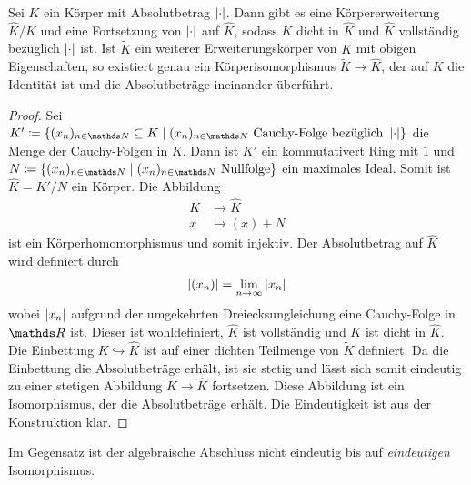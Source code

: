\begin{satz}
Sei $K$ ein Körper mit Absolutbetrag $\left\vert\cdot\right\vert$.
Dann gibt es eine Körpererweiterung $\hat{K}/K$ und eine Fortsetzung von $\left\vert\cdot\right\vert$ auf $\hat{K}$, sodass $K$ dicht in $\hat{K}$ und $\hat{K}$ vollständig bezüglich $\left\vert\cdot\right\vert$ ist.
Ist $\tilde{K}$ ein weiterer Erweiterungskörper von $K$ mit obigen Eigenschaften,
so existiert genau ein Körperisomorphismus $\tilde{K}\to \hat{K}$, der auf $K$ die Identität ist
und die Absolutbeträge ineinander überführt.
\begin{proof}
Sei $K'\coloneqq\{(x_n)_{n\in \N}\subseteq K \mid (x_n)_{n\in \N} \text{ Cauchy-Folge bezüglich } \abs{\cdot}\}$ die Menge der Cauchy-Folgen in $K$.
Dann ist $K'$ ein kommutativert Ring mit $1$ und $N\coloneqq\{(x_n)_{n\in \N}\mid (x_n)_{n\in \N} \text{ Nullfolge}\}$
ein maximales Ideal.
Somit ist $\hat{K}=K'/N$ ein Körper. Die Abbildung
\begin{align*}
K &\to \hat{K}\\
x &\mapsto (x)+N
\end{align*}
ist ein Körperhomomorphismus und somit injektiv.
Der Absolutbetrag auf $\hat{K}$ wird definiert durch
\begin{align*}
\left\vert(x_n)\right\vert=\lim_{n\to \infty} \left\vert x_n\right\vert
\end{align*}
wobei $\left\vert x_n\right\vert$ aufgrund der umgekehrten Dreiecksungleichung eine Cauchy-Folge in $\R$ ist.
Dieser ist wohldefiniert, $\hat{K}$ ist vollständig und $K$ ist dicht in $\hat{K}$.
Die Einbettung $K \hookrightarrow \hat{K}$ ist auf einer dichten Teilmenge von $\tilde{K}$ definiert.
Da die Einbettung die Absolutbeträge erhält, ist sie stetig und lässt sich somit eindeutig zu einer stetigen Abbildung $\tilde{K}\to \hat{K}$ fortsetzen.
Diese Abbildung ist ein Isomorphismus, der die Absolutbeträge erhält.
Die Eindeutigkeit ist aus der Konstruktion klar.
\end{proof}
\end{satz}

\begin{bem}
Im Gegensatz ist der algebraische Abschluss nicht eindeutig bis auf \emph{eindeutigen} Isomorphismus.
\end{bem}